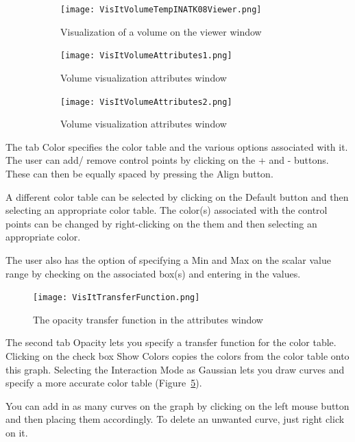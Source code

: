 \begin{figure}[htb]
  \centering
  \begin{subfigure}[b]{0.3\textwidth}
    \texttt{[image: VisItVolumeTempINATK08Viewer.png]}
    \caption{Visualization of a volume on the viewer window}
    \label{VisItVolumeTempINATK08Viewer}
  \end{subfigure}
  \begin{subfigure}[b]{0.3\textwidth}
    \texttt{[image: VisItVolumeAttributes1.png]}
    \caption{Volume visualization attributes window}
    \label{VisItVolumeAttributes1}
  \end{subfigure}
  \begin{subfigure}[b]{0.3\textwidth}
    \texttt{[image: VisItVolumeAttributes2.png]}
    \caption{Volume visualization attributes window}
    \label{VisItVolumeAttributes2}
  \end{subfigure}
  \caption{}
  \label{ucf.fig5}
\end{figure}

The tab Color specifies the color table and the various options
associated with it. The user can add/ remove control points by
clicking on the + and - buttons. These can then be equally spaced by
pressing the Align button.

A different color table can be selected by clicking on the Default
button and then selecting an appropriate color table. The color(s)
associated with the control points can be changed by right-clicking on
the them and then selecting an appropriate color.

The user also has the option of specifying a Min and Max on the scalar
value range by checking on the associated box(s) and entering in the
values.

\begin{figure}
  \center
  \texttt{[image: VisItTransferFunction.png]}
  \caption{The opacity transfer function in the attributes window}
  \label{VisItTransferFunction}
\end{figure}

The second tab Opacity lets you specify a transfer function for the
color table. Clicking on the check box Show Colors copies the colors
from the color table onto this graph. Selecting the Interaction Mode
as Gaussian lets you draw curves and specify a more accurate color
table (Figure~\ref{VisItTransferFunction}).

You can add in as many curves on the graph by clicking on the left
mouse button and then placing them accordingly. To delete an unwanted
curve, just right click on it.

